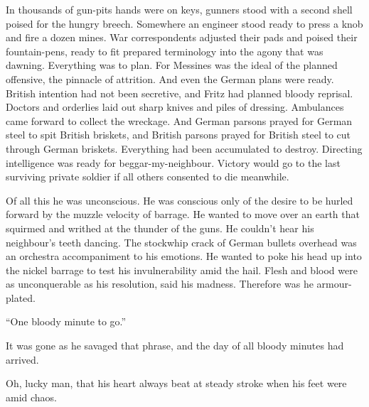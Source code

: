 In thousands of gun-pits hands were on keys, gunners stood with a second shell poised for the hungry breech. Somewhere an engineer stood ready to press a knob and fire a dozen mines. War correspondents adjusted their pads and poised their fountain-pens, ready to fit prepared terminology into the agony that was dawning. Everything was to plan. For Messines was the ideal of the planned offensive, the pinnacle of attrition. And even the German plans were ready. British intention had not been secretive, and Fritz had planned bloody reprisal. Doctors and orderlies laid out sharp knives and piles of dressing. Ambulances came forward to collect the wreckage. And German parsons prayed for German steel to spit British briskets, and British parsons prayed for British steel to cut through German briskets. Everything had been accumulated to destroy. Directing intelligence was ready for beggar-my-neighbour. Victory would go to the last surviving private soldier if all others consented to die meanwhile.

Of all this he was unconscious. He was conscious only of the desire to be hurled forward by the muzzle velocity of barrage. He wanted to move over an earth that squirmed and writhed at the thunder of the guns. He couldn't hear his neighbour's teeth dancing. The stockwhip crack of German bullets overhead was an orchestra accompaniment to his emotions. He wanted to poke his head up into the nickel barrage to test his invulnerability amid the hail. Flesh and blood were as unconquerable as his resolution, said his madness. Therefore was he armour-plated.

``One bloody minute to go.''

It was gone as he savaged that phrase, and the day of all bloody minutes had arrived.

Oh, lucky man, that his heart always beat at steady stroke when his feet were amid chaos.


